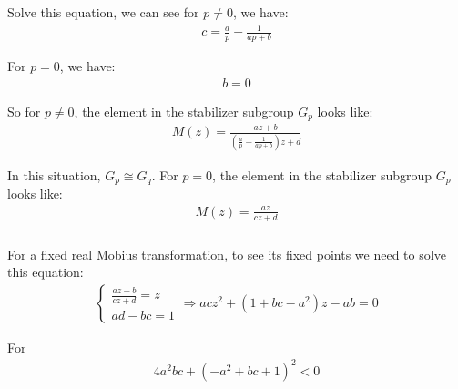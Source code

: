 \documentclass[]{ctexart}
\begin{document}
			Solve this equation, we can see for $p\neq 0$, we have:
				\begin{equation*}
				\begin{aligned}
					c=\frac{a}{p}-\frac{1}{ap+b}
				\end{aligned}
				\end{equation*}
				
			For $p=0$, we have:
				\begin{equation*}
				\begin{aligned}
					b=0
				\end{aligned}
				\end{equation*}
			
			So for $p\neq 0$, the element in the stabilizer subgroup $G_p$ looks like:
				\begin{equation*}
				\begin{aligned}
					M(z)=\frac{az+b}{\left(\frac{a}{p}-\frac{1}{ap+b}\right)z+d}
				\end{aligned}
				\end{equation*}
				
			In this situation, $G_p\cong G_q$. For $p=0$,  the element in the stabilizer subgroup $G_p$ looks like:
				\begin{equation*}
				\begin{aligned}
					M(z)=\frac{az}{cz+d}
				\end{aligned}
				\end{equation*}
			
		\subsubsection{}
			For a fixed real Mobius transformation, to see its fixed points we need to solve this equation:
				\begin{equation*}
				\begin{aligned}
					\begin{cases}
					\frac{az+b}{cz+d}=z\\
					ad-bc=1
					\end{cases}
					\Rightarrow acz^2+(1+bc-a^2)z-ab=0
				\end{aligned}
				\end{equation*}
			
			For
				\begin{equation*}
				\begin{aligned}
					4 a^2 b c+\left(-a^2+b c+1\right)^2<0
				\end{aligned}
				\end{equation*}
				
\end{document}
